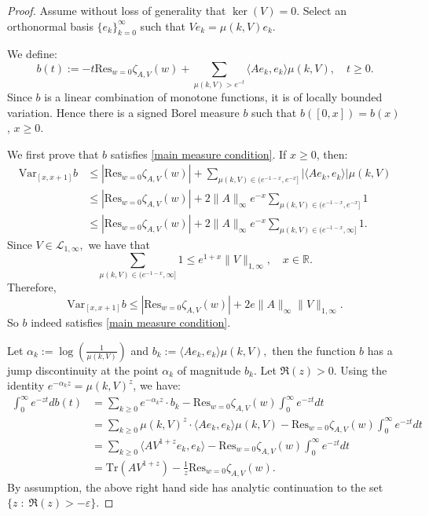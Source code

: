     \begin{proof} 
        Assume without loss of generality that $\ker(V) = 0$. Select an orthonormal basis $\{e_k\}_{k=0}^\infty$
        such that $Ve_k = \mu(k,V)e_k$.
    
        We define:
        $$b(t):=-t\mathrm{Res}_{w=0}\zeta_{A,V}(w)+\sum_{\mu(k,V)>e^{-t}}\langle Ae_k,e_k\rangle\mu(k,V),\quad t \geq 0.$$
        Since $b$ is a linear combination of monotone functions, it is of locally bounded variation. Hence there is a signed Borel measure $b$
        such that $b([0,x]) = b(x)$, $x \geq 0$.
        
        We first prove that $b$ satisfies \eqref{main measure condition}. If $x \geq 0$, then:        
        \begin{align*}
            \mathrm{Var}_{[x,x+1]}b &\leq |\mathrm{Res}_{w=0}\zeta_{A,V}(w)|+\sum_{\mu(k,V)\in(e^{-1-x},e^{-x}]}|\langle Ae_k,e_k\rangle|\mu(k,V)\\
                            &\leq |\mathrm{Res}_{w=0}\zeta_{A,V}(w)|+2\|A\|_{\infty}e^{-x}\sum_{\mu(k,V)\in(e^{-1-x},e^{-x}]}1\\
                            &\leq |\mathrm{Res}_{w=0}\zeta_{A,V}(w)|+2\|A\|_{\infty}e^{-x}\sum_{\mu(k,V)\in(e^{-1-x},\infty]}1.
        \end{align*}
        Since $V\in\mathcal{L}_{1,\infty},$ we have that
        $$\sum_{\mu(k,V)\in(e^{-1-x},\infty]}1\leq e^{1+x}\|V\|_{1,\infty},\quad x\in\mathbb{R}.$$
        Therefore,
        $$\mathrm{Var}_{[x,x+1]}b\leq |\mathrm{Res}_{w=0}\zeta_{A,V}(w)|+2e\|A\|_{\infty}\|V\|_{1,\infty}.$$
        So $b$ indeed satisfies \eqref{main measure condition}.

        Let $\alpha_k:= \log(\frac1{\mu(k,V)})$ and $b_k:=\langle Ae_k,e_k\rangle\mu(k,V),$ then
        the function $b$ has a jump discontinuity at the point $\alpha_k$ of magnitude $b_k.$ Let $\Re(z) > 0$. Using the identity $e^{-\alpha_k z} = \mu(k,V)^z$, we have:
        \begin{align*}
        \int_0^{\infty}e^{-zt}db(t) &= \sum_{k\geq0}e^{-\alpha_k z}\cdot b_k-\mathrm{Res}_{w=0}\zeta_{A,V}(w)\int_0^{\infty}e^{-zt}dt\\
                                    &= \sum_{k\geq0}\mu(k,V)^z\cdot\langle Ae_k,e_k\rangle\mu(k,V)-\mathrm{Res}_{w=0}\zeta_{A,V}(w)\int_0^{\infty}e^{-zt}dt\\
                                    &= \sum_{k\geq0}\langle AV^{1+z}e_k,e_k\rangle-\mathrm{Res}_{w=0}\zeta_{A,V}(w)\int_0^{\infty}e^{-zt}dt\\
                                    &= \mathrm{Tr}(AV^{1+z})-\frac1z\mathrm{Res}_{w=0}\zeta_{A,V}(w).
        \end{align*}
        By assumption, the above right hand side has analytic continuation to the set $\{z\;:\;\Re(z) > -\varepsilon\}$.


\end{proof}
